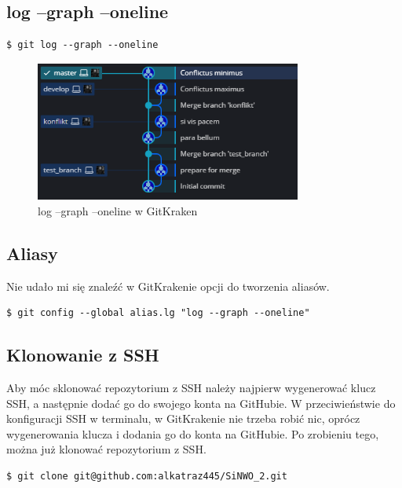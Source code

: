 \documentclass[a4paper,12pt]{article}
\begin{document}
\subsection{log --graph --oneline}
\begin{lstlisting}[caption={log --graph --oneline w terminalu},captionpos=b]
    $ git log --graph --oneline
\end{lstlisting}
\begin{figure}[ht]
    \centering
    \includegraphics[width=0.78\textwidth]{images/log.png}
    \caption{log --graph --oneline w GitKraken}
\end{figure}

\newpage
\clearpage

\subsection{Aliasy}
Nie udało mi się znaleźć w GitKrakenie opcji do tworzenia aliasów.

\begin{lstlisting}[caption={Przykładowy alias w terminalu},captionpos=b]
    $ git config --global alias.lg "log --graph --oneline"
\end{lstlisting}
\subsection{Klonowanie z SSH}
Aby móc sklonować repozytorium z SSH należy najpierw wygenerować klucz SSH, a następnie dodać go do swojego konta na GitHubie. W przeciwieństwie do konfiguracji SSH w terminalu, w GitKrakenie nie trzeba robić nic, oprócz wygenerowania klucza i dodania go do konta na GitHubie. Po zrobieniu tego, można już klonować repozytorium z SSH.
\begin{lstlisting}[caption={Klonowanie z SSH w terminalu},captionpos=b]
    $ git clone git@github.com:alkatraz445/SiNWO_2.git
\end{lstlisting}
\end{document}
